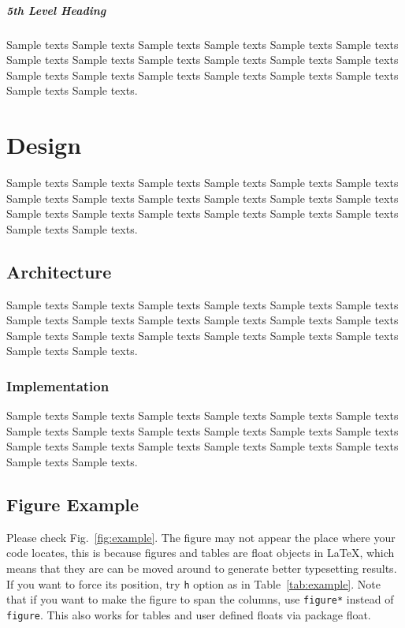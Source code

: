 \documentclass{ics}
\begin{document}
\subparagraph{5th Level Heading}
\label{sec:5th-level-heading}
Sample texts Sample texts Sample texts Sample texts Sample texts Sample texts
Sample texts Sample texts Sample texts Sample texts Sample texts Sample texts
Sample texts Sample texts Sample texts Sample texts Sample texts Sample texts
Sample texts Sample texts.

\section{Design}
\label{sec:design}
Sample texts Sample texts Sample texts Sample texts Sample texts Sample texts
Sample texts Sample texts Sample texts Sample texts Sample texts Sample texts
Sample texts Sample texts Sample texts Sample texts Sample texts Sample texts
Sample texts Sample texts.

\subsection{Architecture}
\label{sec:architecture}
Sample texts Sample texts Sample texts Sample texts Sample texts Sample texts
Sample texts Sample texts Sample texts Sample texts Sample texts Sample texts
Sample texts Sample texts Sample texts Sample texts Sample texts Sample texts
Sample texts Sample texts.

\subsubsection{Implementation}
\label{sec:implementation}
Sample texts Sample texts Sample texts Sample texts Sample texts Sample texts
Sample texts Sample texts Sample texts Sample texts Sample texts Sample texts
Sample texts Sample texts Sample texts Sample texts Sample texts Sample texts
Sample texts Sample texts.

\subsection{Figure Example}
\label{sec:figure-example}
Please check Fig.~\ref{fig:example}. The figure may not appear the place where
your code locates, this is because figures and tables are float objects in
\LaTeX, which means that they are can be moved around to generate better
typesetting results. If you want to force its position, try \texttt{h} option as
in Table~\ref{tab:example}. Note that if you want to make the figure to span the
columns, use \texttt{figure*} instead of \texttt{figure}. This also works for
tables and user defined floats via package \textsf{float}.
\end{document}
